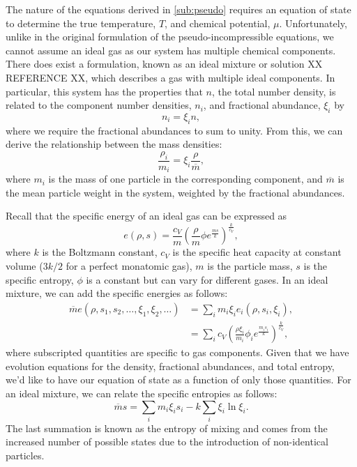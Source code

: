 The nature of the equations derived in \ref{sub:pseudo} requires an equation of state to determine the true temperature, $T$, and chemical potential, $\mu$.
Unfortunately, unlike in the original \citet{Durran1989} formulation of the pseudo-incompressible equations, we cannot assume an ideal gas as our system has multiple chemical components.
There does exist a formulation, known as an ideal mixture or solution XX REFERENCE XX, which describes a gas with multiple ideal components.
In particular, this system has the properties that $n$, the total number density, is related to the component number densities, $n_{i}$, and fractional abundance, $\xi_{i}$ by
\begin{equation}
	n_{i}=\xi_{i}n,
\end{equation}
where we require the fractional abundances to sum to unity.
From this, we can derive the relationship between the mass densities:
\begin{equation}
	\frac{\rho_{i}}{m_{i}}=\xi_{i}\frac{\rho}{\overline{m}},
\end{equation}
where $m_{i}$ is the mass of one particle in the corresponding component, and $\overline{m}$ is the mean particle weight in the system, weighted by the fractional abundances.

Recall that the specific energy of an ideal gas can be expressed as
\begin{equation}
	e\left(\rho,s\right)=\frac{c_{V}}{m}\left(\frac{\rho}{m}\phi e^{\frac{ms}{k}}\right)^{\frac{k}{c_{V}}},
\end{equation}
where $k$ is the Boltzmann constant, $c_{V}$ is the specific heat capacity at constant volume ($3k/2$ for a perfect monatomic gas), $m$ is the particle mass, $s$ is the specific entropy, $\phi$ is a constant but can vary for different gases.
In an ideal mixture, we can add the specific energies as follows:
\begin{align}
	\overline{m} e\left(\rho,s_{1},s_{2},\dots,\xi_{1},\xi_{2},\dots\right)&=\sum_{i} m_{i} \xi_{i} e_{i}\left(\rho,s_{i},\xi_{i}\right),\\
	&=\sum_{i}c_{V}\left(\frac{\rho\xi_{i}}{m_{i}}\phi_{i} e^{\frac{m_{i}s_{i}}{k}}\right)^{\frac{k}{c_{V}}},
\end{align}
where subscripted quantities are specific to gas components.
Given that we have evolution equations for the density, fractional abundances, and total entropy, we'd like to have our equation of state as a function of only those quantities.
For an ideal mixture, we can relate the specific entropies as follows:
\begin{equation}
	\label{eq:totalentropy}
	\overline{m} s=\sum_{i}m_{i}\xi_{i}s_{i}-k\sum_{i}\xi_{i}\ln{\xi_{i}}.
\end{equation}
The last summation is known as the entropy of mixing and comes from the increased number of possible states due to the introduction of non-identical particles.

